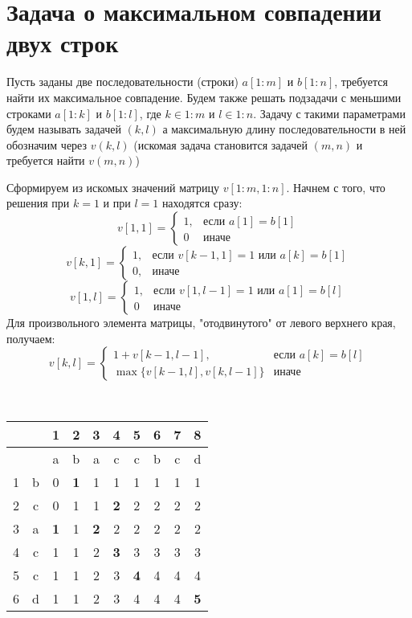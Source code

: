 \documentclass[discrete.tex]{subfiles}
\begin{document}
  \section{Задача о максимальном совпадении двух строк}

  \begin{Task}
    Пусть заданы две последовательности (строки) $a[1:m]$ и $b[1:n]$, требуется найти их максимальное совпадение. Будем также решать подзадачи с меньшими строками $a[1:k]$ и $b[1:l]$, где $k \in 1:m$ и $l \in 1:n$. Задачу с такими параметрами будем называть задачей $(k,l)$ а максимальную длину последовательности в ней обозначим через $v(k,l)$ (искомая задача становится задачей $(m,n)$ и требуется найти $v(m,n)$)

    Сформируем из искомых значений матрицу $v[1:m,1:n]$. Начнем с того, что решения при $k=1$ и при $l=1$ находятся сразу:
    \[v[1,1] = \begin{cases}
      1, & \text{если }a[1]=b[1]\\
      0 & \text{иначе}
    \end{cases}\]
    \[v[k,1] = \begin{cases}
      1, & \text{если }v[k-1,1]=1 \text{ или } a[k]=b[1]\\
      0, & \text{иначе}
    \end{cases}\]
    \[v[1,l] = \begin{cases}
      1, & \text{если }v[1,l-1]=1 \text{ или } a[1]=b[l]\\
      0 & \text{иначе}
    \end{cases}\]
    Для произвольного элемента матрицы, "отодвинутого"{} от левого верхнего края, получаем:
    \[v[k,l] = \begin{cases}
      1 + v[k-1,l-1], & \text{если }a[k]=b[l]\\
      \max\{v[k-1,l],v[k,l-1]\} & \text{иначе}
    \end{cases}\]
  \end{Task}

  \begin{example} \ \\
    \begin{tabular}{c|c|cccccccc}
        &   & 1 & 2 & 3 & 4 & 5 & 6 & 7 & 8\\
        \hline
        &   & a & b & a & c & c & b & c & d\\
      \hline
      1 & b & 0 & \bfseries 1 & 1 & 1 & 1 & 1 & 1 & 1\\
      2 & c & 0 & 1 & 1 & \bfseries 2 & 2 & 2 & 2 & 2\\
      3 & a & \bfseries 1 & 1 & \bfseries 2 & 2 & 2 & 2 & 2 & 2\\
      4 & c & 1 & 1 & 2 & \bfseries 3 & 3 & 3 & 3 & 3\\
      5 & c & 1 & 1 & 2 & 3 & \bfseries 4 & 4 & 4 & 4\\
      6 & d & 1 & 1 & 2 & 3 & 4 & 4 & 4 & \bfseries 5
    \end{tabular}
  \end{example}
\end{document}
